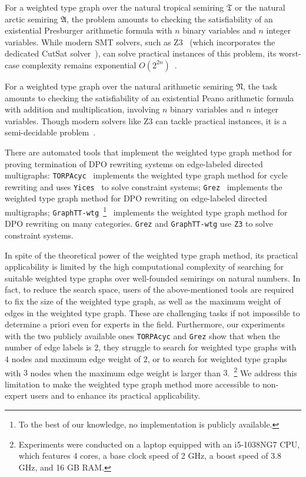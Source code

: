     For a weighted type graph over the natural tropical semiring $\mathfrak{T}$ or the natural arctic semiring $\mathfrak{A}$, the problem amounts to
    checking the satisfiability of an existential Presburger arithmetic formula with $n$ binary variables and $n$ integer variables.
    While modern SMT solvers, such as Z3~\cite{de2008z3} (which incorporates the dedicated CutSat solver~\cite{z3ilp_cutsat}), can solve practical instances of this problem, its worst-case complexity remains exponential \( O(2^{2n}) \)~\cite{arithmetic2024z3}.

     For a weighted type graph over the natural arithmetic semiring $\mathfrak{N}$, the task amounts to
     checking the satisfiability of an existential Peano arithmetic formula with addition and multiplication, involving $n$ binary variables and $n$ integer variables. Though modern solvers like Z3 can tackle practical instances, it is a semi-decidable problem~\cite{matiyasevivc2003enumerable}.

    There are automated tools that implement the weighted type graph method for proving termination of DPO rewriting systems on edge-labeled directed multigraphs:  
    \texttt{TORPAcyc}~\cite{TORPAcyc} implements the weighted type graph method for cycle rewriting and uses \texttt{Yices}~\cite{yices} to solve constraint systems;
    \texttt{Grez}~\cite{grez} implements the weighted type graph method for DPO rewriting on edge-labeled directed multigraphs; \texttt{GraphTT-wtg}~\footnote{To the best of our knowledge, no implementation is publicly available.}~\cite{endrullis2024generalized_arxiv_v3} implements the weighted type graph method for DPO rewriting on many categories.
    \texttt{Grez} and \texttt{GraphTT-wtg}  
    use \texttt{Z3} to solve constraint systems.

    In spite of the theoretical power of the weighted type graph method, its practical applicability is limited by the high computational complexity of searching for suitable weighted type graphs over well-founded semirings on 
    natural numbers. In fact, to reduce the search space, users of the above-mentioned tools are required
     to fix the size of the weighted type graph, as well as the maximum weight of edges in the weighted type graph. These are challenging tasks if not impossible to determine a priori even for experts in the field. 
    Furthermore, our experiments with the two publicly available ones \texttt{TORPAcyc} and \texttt{Grez} show that when the number of edge labels is $2$, they struggle to search for weighted type graphs with $4$ nodes and maximum edge weight of $2$, or to search for weighted type graphs with $3$ nodes when the maximum edge weight is larger than $3$.~\footnote{Experiments were conducted on a laptop equipped with an i5-1038NG7 CPU, which features 4 cores, a base clock speed of 2 GHz, a boost speed of 3.8 GHz, and 16 GB RAM.}
   We address this limitation to make the weighted type graph method more accessible to non-expert users and to enhance its practical applicability.

